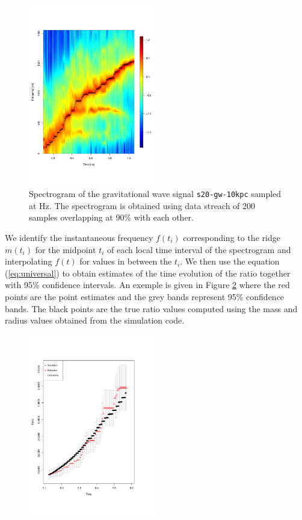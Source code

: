 \begin{figure}
 \centering
 \includegraphics[width=0.5\textwidth,height=0.3\textheight]{plots/spectrogram}
 \caption{Spectrogram of the gravitational wave signal {\tt s20-gw-10kpc} sampled at \unit[4096]{Hz}.
   The spectrogram is obtained using data streach of 200 samples overlapping at 90\%
   with each other.} \label{fig:spectrogram}
\end{figure}


We identify the instantaneous frequency $f(t_i)$ corresponding to the ridge $m(t_i)$ for
the midpoint $t_i$ of each local time interval of the spectrogram and interpolating $f(t)$
for values in between the $t_i$. We then use the equation (\ref{eq:universal}) to obtain
estimates of the time evolution of the ratio together with 95\% confidence intervals.
An exemple is given in Figure \ref{fig:ratio} where the red points are the point estimates and
the grey bands represent 95\% confidence bands. The black points are the true ratio values
computed using the mass and radius values obtained from the simulation code. 

\begin{figure}
 \centering
 \includegraphics[width=0.5\textwidth,height=0.3\textheight]{plots/ratio}
 \caption{} \label{fig:ratio}
\end{figure}


